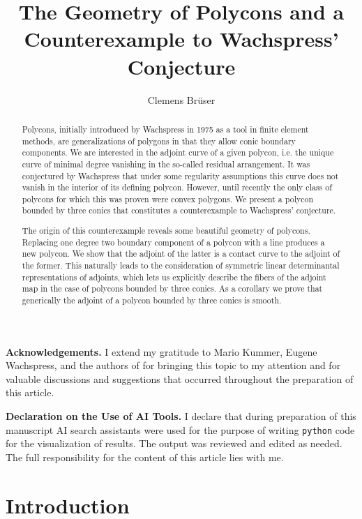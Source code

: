 \documentclass[a4paper,10pt]{amsart}
\title[The Geometry of Polycons and Wachspress' Conjecture]{The Geometry of Polycons and a  Counterexample to Wachspress' Conjecture}
\author{Clemens Brüser}
\theoremstyle{definition}
\theoremstyle{plain}
\begin{document}


\begin{abstract}
 Polycons, initially introduced by Wachspress in 1975 as a tool in finite element methods, are generalizations of polygons in that they allow conic boundary components. We are interested in the adjoint curve of a given polycon, i.e. the unique curve of minimal degree vanishing in the so-called residual arrangement. It was conjectured by Wachspress that under some regularity assumptions this curve does not vanish in the interior of its defining polycon. However, until recently the only class of polycons for which this was proven were convex polygons. We present a polycon bounded by three conics that constitutes a counterexample to Wachspress' conjecture.
 
 The origin of this counterexample reveals some beautiful geometry of polycons. Replacing one degree two boundary component of a polycon with a line produces a new polycon. We show that the adjoint of the latter is a contact curve to the adjoint of the former. This naturally leads to the consideration of symmetric linear determinantal representations of adjoints, which lets us explicitly describe the fibers of the adjoint map in the case of polycons bounded by three conics. As a corollary we prove that generically the adjoint of a polycon bounded by three conics is smooth.
\end{abstract}
\maketitle

\noindent \textbf{Acknowledgements.} I extend my gratitude to Mario Kummer, Eugene Wachspress, and the authors of \cite{KohnEtAl2024AdjCurves} for bringing this topic to my attention and for valuable discussions and suggestions that occurred throughout the preparation of this article.

\noindent \textbf{Declaration on the Use of AI Tools.} I declare that during preparation of this manuscript AI search assistants were used for the purpose of writing \texttt{python} code for the visualization of results. The output was reviewed and edited as needed. The full responsibility for the content of this article lies with me.

\section{Introduction}
\end{document}
